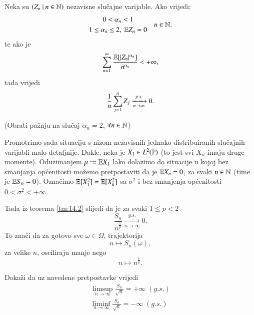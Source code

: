 \begin{zad} \label{zad:14.8}
    Neka su $({Z_n} \: | \: {n \in \mathbb{N}})$ nezavisne slu\v cajne varijable.
    Ako vrijedi:
    \begin{equation*}
        \begin{gathered}
            \begin{gathered}
                0 < \alpha_n < 1\\
                1 \leq \alpha_n \leq 2, \; \mathbb{E} Z_n = 0
            \end{gathered}
            \quad n \in \mathbb{N}.
        \end{gathered}
    \end{equation*}
    te ako je
    \begin{equation*}
        \sum\limits_{n = 1}^{\infty} \frac{\mathbb{E} [|Z_n|^{\alpha_n}]}{n^{\alpha_n}} < +\infty,
    \end{equation*}
    tada vrijedi
    \begin{equation*}
        \frac{1}{n} \sum\limits_{j = 1}^{n} Z_j \xrightarrow[n \to \infty]{g.s.} 0.
    \end{equation*}
\end{zad}
(Obrati pa\v znju na slu\v caj $\alpha_n = 2$, $\forall n \in \mathbb{N}$)

Promotrimo sada situaciju s nizom nezavisnih jednako distribuiranih slu\v cajnih varijabli malo detaljnije.
Dakle, neka je $X_1 \in L^2 (\mathbb{P})$ (to jest svi $X_n$ imaju druge momente).
Oduzimanjem $\mu := \mathbb{E} X_1$ lako dolazimo do situacije u kojoj bez smanjanja op\' cenitosti mo\v zemo pretpostaviti da je $\mathbb{E} X_n = 0$, za svaki $n \in \mathbb{N}$ (time je $\mathbb{E} S_n = 0$).
Ozna\v cimo $\mathbb{E} [X_1^2] = \mathbb{E} [X_n^2]$ sa $\sigma^2$ i bez smanjenja op\' cenitosti $0 < \sigma^2 < +\infty$.

Tada iz teorema \ref{tm:14.2} slijedi da je za svaki $1 \leq p < 2$
\begin{equation}    \label{jed:14.9}
    \frac{S_n}{n^\frac{1}{p}} \xrightarrow[n \to \infty]{g.s.} 0.
\end{equation}
To zna\v ci da za gotovo sve $\omega \in \Omega$, trajektorija
\begin{equation*}
    n \mapsto S_n (\omega),
\end{equation*}
za velike $n$, osciliraju manje nego
\begin{equation*}
    n \mapsto n^\frac{1}{p}.
\end{equation*}

%
%

\begin{zad} \label{zad:14.10}
    Doka\v zi da uz navedene pretpostavke vrijedi
    \begin{equation*}
        \begin{gathered}
            \limsup\limits_{n \to \infty} \frac{S_n}{\sqrt{n}} = +\infty \; (g.s.)\\
            \liminf\limits_{n \to \infty} \frac{S_n}{\sqrt{n}} = -\infty \; (g.s.)
        \end{gathered}
    \end{equation*}
\end{zad}


